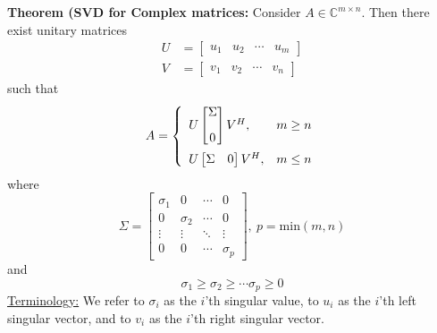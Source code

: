 \documentclass[letterpaper]{article}
\newcommand{\cp}{\mathbb C}    %
\begin{document}
\textbf{Theorem (SVD for Complex matrices:} Consider $A\in \cp^{m \times n}$. Then there exist unitary matrices
$$\begin{aligned}
U&=\begin{bmatrix}u_1 & u_2 & \cdots & u_m \end{bmatrix} \\
V&=\begin{bmatrix}v_1 & v_2 & \cdots & v_n \end{bmatrix}
\end{aligned}$$
such that
$$A=\left\{\begin{array}{ll}
U\begin{bmatrix} \Sigma \\[2ex] 0 \end{bmatrix}V^H, & m\ge n \vspace{5pt}\\
U\begin{bmatrix} \Sigma & 0 \end{bmatrix}V^H, & m\le n
\end{array}\right.$$
where
$$\Sigma=\left[\begin{array}{cccc} \sigma_1 & 0 & \cdots & 0 \\ 0 & \sigma_2 & \cdots & 0 \\ \vdots & \vdots &\ddots & \vdots \\ 0 & 0 & \cdots & \sigma_{p}\end{array}\right],~p=\text{min}(m,n)$$
and
$$\sigma_1\ge\sigma_2\ge\cdots\sigma_{p}\ge0$$
\noindent \underline{Terminology:} We refer to $\sigma_i$  as the $i$'th singular value, to $u_i$ as the $i$'th left singular vector, and to $v_i$ as the $i$'th  right singular vector. \\
\\
\\
\end{document}

